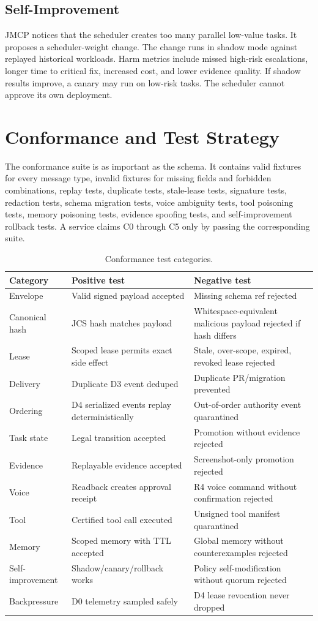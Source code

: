 \documentclass[journal,onecolumn]{IEEEtran}
\begin{document}
\subsection{Self-Improvement}
JMCP notices that the scheduler creates too many parallel low-value tasks. It proposes a scheduler-weight change. The change runs in shadow mode against replayed historical workloads. Harm metrics include missed high-risk escalations, longer time to critical fix, increased cost, and lower evidence quality. If shadow results improve, a canary may run on low-risk tasks. The scheduler cannot approve its own deployment.

\section{Conformance and Test Strategy}
The conformance suite is as important as the schema. It contains valid fixtures for every message type, invalid fixtures for missing fields and forbidden combinations, replay tests, duplicate tests, stale-lease tests, signature tests, redaction tests, schema migration tests, voice ambiguity tests, tool poisoning tests, memory poisoning tests, evidence spoofing tests, and self-improvement rollback tests. A service claims C0 through C5 only by passing the corresponding suite.

\begin{longtable}{p{}p{}p{}}
\caption{Conformance test categories.}\\
\toprule
Category & Positive test & Negative test\\
\midrule
Envelope & Valid signed payload accepted & Missing schema ref rejected\\
Canonical hash & JCS hash matches payload & Whitespace-equivalent malicious payload rejected if hash differs\\
Lease & Scoped lease permits exact side effect & Stale, over-scope, expired, revoked lease rejected\\
Delivery & Duplicate D3 event deduped & Duplicate PR/migration prevented\\
Ordering & D4 serialized events replay deterministically & Out-of-order authority event quarantined\\
Task state & Legal transition accepted & Promotion without evidence rejected\\
Evidence & Replayable evidence accepted & Screenshot-only promotion rejected\\
Voice & Readback creates approval receipt & R4 voice command without confirmation rejected\\
Tool & Certified tool call executed & Unsigned tool manifest quarantined\\
Memory & Scoped memory with TTL accepted & Global memory without counterexamples rejected\\
Self-improvement & Shadow/canary/rollback works & Policy self-modification without quorum rejected\\
Backpressure & D0 telemetry sampled safely & D4 lease revocation never dropped\\
\bottomrule
\end{longtable}
\end{document}
